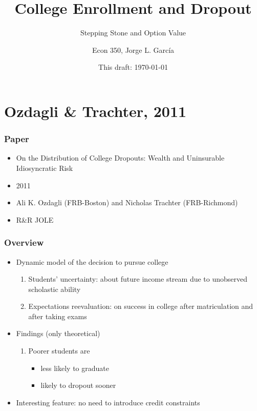 

\title{College Enrollment and Dropout}
\subtitle{Stepping Stone and Option Value}
\author{Econ 350, Jorge L. Garc\'{i}a}
\date{This draft: \today}




\begin{frame}[plain]
	\titlepage
\end{frame}



\section{Ozdagli \& Trachter, 2011}

\begin{frame}
	\frametitle{Paper}
		\begin{itemize}
			\item On the Distribution of College Dropouts: Wealth and Uninsurable Idiosyncratic Risk
			\item 2011
			\item Ali K. Ozdagli (FRB-Boston) and Nicholas Trachter (FRB-Richmond)
			\item R\&R JOLE 
		\end{itemize}
\end{frame}

\begin{frame}
	\frametitle{Overview}
		\begin{itemize}
			\item Dynamic model of the decision to pursue college
				\begin{enumerate}
					\item Students' uncertainty: about future income stream due to unobserved scholastic ability
					\item Expectations reevaluation: on success in college after matriculation and after taking exams 
				\end{enumerate}
			\item Findings (only theoretical)
				\begin{enumerate}
					\item Poorer students are
						\begin{itemize}
							\item less likely to graduate
							\item likely to dropout sooner
						\end{itemize}
				\end{enumerate}
			\item Interesting feature: no need to introduce credit constraints
		\end{itemize}
\end{frame}

